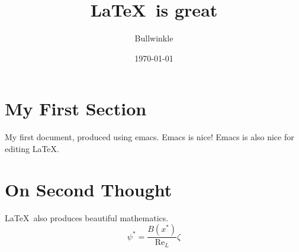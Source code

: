 \documentclass{article}
\begin{document}
\title{\LaTeX\ is great}
\author{Bullwinkle}
\date{\today}
\maketitle

\tableofcontents

\section{My First Section}

My first document, produced using emacs.  Emacs is nice!
Emacs is also nice for editing \LaTeX.

\section{On Second Thought}

\LaTeX\ also  produces beautiful mathematics.
\begin{equation}
\psi^\ast = \frac{B(x^\ast)}{\mathrm{Re}_L}\zeta
\end{equation}
\end{document}
